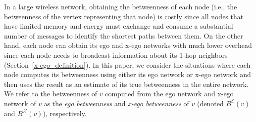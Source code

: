 \documentclass[preprint,12pt,authoryear]{elsarticle}
\newcommand{\EN}[1]{\mathcal{E}_{{#1}}}
\newcommand{\XN}[1]{\mathcal{X}_{{#1}}}
\newcommand{\BE}[1]{B^{\mathcal{E}}({#1})}
\newcommand{\BX}[1]{B^{\mathcal{X}}({#1})}
\theoremstyle{definition}
\begin{document}
% 

In a large wireless network, obtaining the betweenness of each node (i.e., the betweenness of the vertex representing that node) is costly since  all nodes that have limited memory and energy must exchange and consume a substantial number of messages to identify the shortest paths between them.
On the other hand, each node can obtain its ego and x-ego networks with much lower overhead since each node  needs to broadcast information about its 1-hop neighbors (Section~\ref{x-ego_definition}). 
In this paper, we consider the situations where each node computes its betweenness using either its ego network or x-ego network and then uses the result as an estimate of its true betweenness in the entire network.
We refer to the betweenness of $v$ computed from the ego network and x-ego network of $v$ as the {\em ego betweenness} and {\em x-ego betweenness} of $v$ (denoted $\BE{v}$ and $\BX{v}$), respectively.
\end{document}
